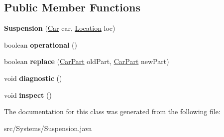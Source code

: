 \subsection*{Public Member Functions}
\begin{DoxyCompactItemize}
\item 
\hypertarget{classSystems_1_1Suspension_a02c52ca922503e8767c440878c81d525}{}{\bfseries Suspension} (\hyperlink{classCars_1_1Car}{Car} car, \hyperlink{enumEnums_1_1Location}{Location} loc)\label{classSystems_1_1Suspension_a02c52ca922503e8767c440878c81d525}

\item 
\hypertarget{classSystems_1_1Suspension_acedd4b1e8d41edb2b50ac421d53a67e5}{}boolean {\bfseries operational} ()\label{classSystems_1_1Suspension_acedd4b1e8d41edb2b50ac421d53a67e5}

\item 
\hypertarget{classSystems_1_1Suspension_a8d5851986a37e773ed09d608db7faba2}{}boolean {\bfseries replace} (\hyperlink{classCars_1_1CarPart}{Car\+Part} old\+Part, \hyperlink{classCars_1_1CarPart}{Car\+Part} new\+Part)\label{classSystems_1_1Suspension_a8d5851986a37e773ed09d608db7faba2}

\item 
\hypertarget{classSystems_1_1Suspension_abed727bc0496355cf1c634482b8721ee}{}void {\bfseries diagnostic} ()\label{classSystems_1_1Suspension_abed727bc0496355cf1c634482b8721ee}

\item 
\hypertarget{classSystems_1_1Suspension_ac19fd8b57b8ed3d738b61f35e36d8ed5}{}void {\bfseries inspect} ()\label{classSystems_1_1Suspension_ac19fd8b57b8ed3d738b61f35e36d8ed5}

\end{DoxyCompactItemize}


The documentation for this class was generated from the following file\+:\begin{DoxyCompactItemize}
\item 
src/\+Systems/Suspension.\+java\end{DoxyCompactItemize}
